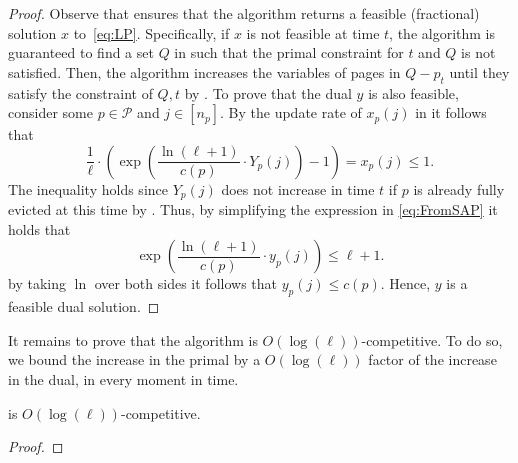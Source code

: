 \documentclass[11pt]{article}
\newcommand{\cP}{{\mathcal{P}}}
\begin{document}
{\begin{proof}
	Observe that  ensures that the algorithm returns a feasible (fractional) solution $x$ to~\eqref{eq:LP}. Specifically, if $x$ is not feasible at time $t$, the algorithm is guaranteed to find a set $Q$ in  such that the primal constraint for $t$ and $Q$ is not satisfied. Then, the algorithm increases the variables of pages in $Q-p_t$ until they satisfy the constraint of $Q,t$ by  . To prove that the dual $y$ is also feasible, consider some $p \in \cP$ and $j \in [n_p]$. By the update rate of $x_p(j)$ in  it follows that 
	\begin{equation}
		\label{eq:FromSAP}
		\frac{1}{\ell} \cdot \left(     \exp \left(  \frac{\ln (\ell+1)}{c(p)} \cdot Y_p(j)\right)-1\right) = x_p(j) \leq 1.
	\end{equation} 
	The inequality holds since $Y_p(j)$ does not increase in time $t$ if $p$ is already fully evicted at this time by . Thus, by simplifying the expression in \eqref{eq:FromSAP} it holds that 
	$$\exp \left( \frac{\ln (\ell+1)}{c(p)} \cdot y_p(j) \right) \leq \ell+1.$$
	by taking $\ln$ over both sides it follows that $y_p(j) \leq c(p)$. Hence, $y$ is a feasible dual solution. 
\end{proof}



It remains to prove that the algorithm is $O(\log (\ell))$-competitive. To do so, we bound the increase in the primal by a $O(\log (\ell))$ factor of the increase in the dual, in every moment in time. 


%
\begin{lemma}
	\label{thm:logL1}
	 is $O(\log (\ell))$-\textnormal{competitive}. 
\end{lemma}

\begin{proof}
	
	
	

\end{proof}}
\end{document}
